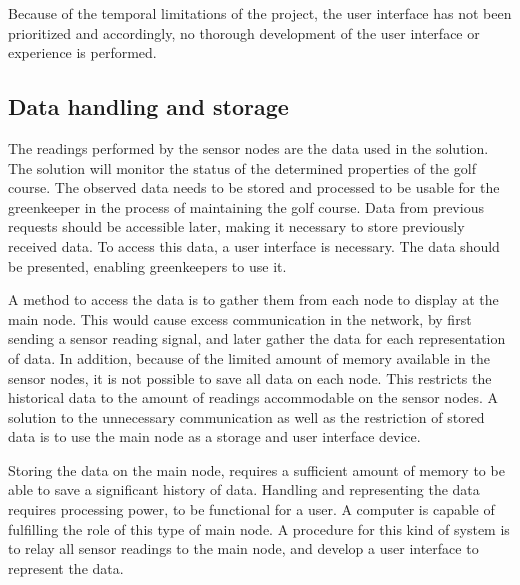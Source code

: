 
Because of the temporal limitations of the project, the user interface has not been prioritized and accordingly, no thorough development of the user interface or experience is performed. 


\subsection{Data handling and storage}
The readings performed by the sensor nodes are the data used in the solution. The solution will monitor the status of the determined properties of the golf course. The observed data needs to be stored and processed to be usable for the greenkeeper in the process of maintaining the golf course. Data from previous requests should be accessible later, making it necessary to store previously received data. To access this data, a user interface is necessary. The data should be presented, enabling greenkeepers to use it.%

A method to access the data is to gather them from each node to display at the main node. This would cause excess communication in the network, by first sending a sensor reading signal, and later gather the data for each representation of data. In addition, because of the limited amount of memory available in the sensor nodes, it is not possible to save all data on each node. This restricts the historical data to the amount of readings accommodable on the sensor nodes. A solution to the unnecessary communication as well as the restriction of stored data is to use the main node as a storage and user interface device.

Storing the data on the main node, requires a sufficient amount of memory to be able to save a significant history of data. Handling and representing the data requires processing power, to be functional for a user. A computer is capable of fulfilling the role of this type of main node. A procedure for this kind of system is to relay all sensor readings to the main node, and develop a user interface to represent the data. 


